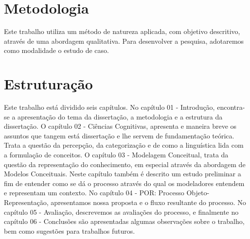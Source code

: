 \section{Metodologia}
\label{sec:metodologia}

Este trabalho utiliza um método de natureza aplicada, com objetivo descritivo, através de uma abordagem qualitativa. Para desenvolver a pesquisa, adotaremos como modalidade o estudo de caso.

\section{Estruturação}
\label{sec:estruturacao}

Este trabalho está dividido seis capítulos. No capítulo 01 - Introdução, encontra-se a apresentação do tema da dissertação, a metodologia e a estrutura da dissertação. O capítulo 02 - Ciências Cognitivas, apresenta e maneira breve os assuntos que tangem está dissertação e lhe servem de fundamentação teórica. Trata a questão da percepção, da categorização e de como a linguística lida com a formulação de conceitos. O capítulo 03 - Modelagem Conceitual, trata da questão da representação do conhecimento, em especial através da abordagem de Modelos Conceituais. Neste capítulo também é descrito um estudo preliminar a fim de entender como se dá o processo através do qual os modeladores entendem e representam um contexto. No capítulo 04 - POR: Processo Objeto-Representação, apresentamos nossa proposta e o fluxo resultante do processo. No capítulo 05 - Avaliação, descrevemos as avaliações do processo, e finalmente no capítulo 06 - Conclusões são apresentadas algumas observações sobre o trabalho, bem como sugestões para trabalhos futuros.